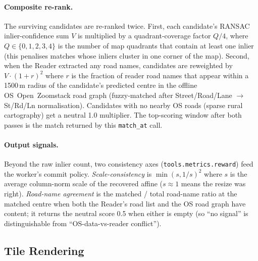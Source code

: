 \documentclass[11pt]{article}
\begin{document}
\paragraph{Composite re-rank.}
The surviving candidates are re-ranked twice. First, each candidate's RANSAC inlier-confidence sum $V$ is multiplied by a quadrant-coverage factor $Q/4$, where $Q \in \{0, 1, 2, 3, 4\}$ is the number of map quadrants that contain at least one inlier (this penalises matches whose inliers cluster in one corner of the map). Second, when the Reader extracted any road names, candidates are reweighted by $V \cdot (1 + r)^2$ where $r$ is the fraction of reader road names that appear within a 1500\,m radius of the candidate's predicted centre in the offline OS~Open~Zoomstack road graph (fuzzy-matched after Street/Road/Lane $\to$ St/Rd/Ln normalisation). Candidates with no nearby OS roads (sparse rural cartography) get a neutral 1.0 multiplier. The top-scoring window after both passes is the match returned by this \texttt{match\_at} call.

\paragraph{Output signals.}
Beyond the raw inlier count, two consistency axes (\texttt{tools.metrics.reward}) feed the worker's commit policy. \emph{Scale-consistency} is $\min(s, 1/s)^2$ where $s$ is the average column-norm scale of the recovered affine ($s \approx 1$ means the resize was right). \emph{Road-name agreement} is the matched / total road-name ratio at the matched centre when both the Reader's road list and the OS road graph have content; it returns the neutral score 0.5 when either is empty (so ``no signal'' is distinguishable from ``OS-data-vs-reader conflict'').

\subsection{Tile Rendering}
\label{subsection:tile-rendering}
\end{document}
